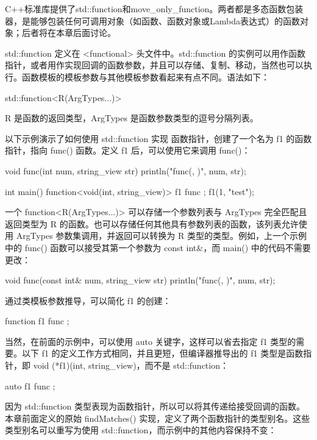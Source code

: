 
C++标准库提供了std::function和move\_only\_function。两者都是多态函数包装器，是能够包装任何可调用对象（如函数、函数对象或Lambda表达式）的函数对象；后者将在本章后面讨论。


std::function 定义在 <functional> 头文件中。std::function 的实例可以用作函数指针，或者用作实现回调的函数参数，并且可以存储、复制、移动，当然也可以执行。函数模板的模板参数与其他模板参数看起来有点不同。语法如下：

\begin{cpp}
std::function<R(ArgTypes...)>
\end{cpp}

R 是函数的返回类型，ArgTypes 是函数参数类型的逗号分隔列表。

以下示例演示了如何使用 std::function 实现 函数指针，创建了一个名为 f1 的函数指针，指向 func() 函数。定义 f1 后，可以使用它来调用 func()：

\begin{cpp}
void func(int num, string_view str) { println("func({}, {})", num, str); }

int main()
{
    function<void(int, string_view)> f1 { func };
    f1(1, "test");
}
\end{cpp}

一个 function<R(ArgTypes...)> 可以存储一个参数列表与 ArgTypes 完全匹配且返回类型为 R 的函数。也可以存储任何其他具有参数列表的函数，该列表允许使用 ArgTypes 参数集调用，并返回可以转换为 R 类型的类型。例如，上一个示例中的 func() 函数可以接受其第一个参数为 const int\&，而 main() 中的代码不需要更改：

\begin{cpp}
void func(const int& num, string_view str) { println("func({}, {})", num, str); }
\end{cpp}

通过类模板参数推导，可以简化 f1 的创建：

\begin{cpp}
function f1 { func };
\end{cpp}

当然，在前面的示例中，可以使用 auto 关键字，这样可以省去指定 f1 类型的需要。以下 f1 的定义工作方式相同，并且更短，但编译器推导出的 f1 类型是函数指针，即 void (*f1)(int, string\_view)，而不是 std::function：

\begin{cpp}
auto f1 { func };
\end{cpp}

因为 std::function 类型表现为函数指针，所以可以将其传递给接受回调的函数。本章前面定义的原始 findMatches() 实现，定义了两个函数指针的类型别名。这些类型别名可以重写为使用 std::function，而示例中的其他内容保持不变：

